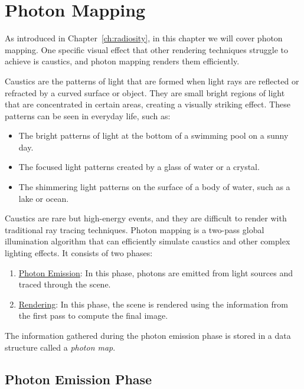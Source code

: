 \chapter{Photon Mapping}\label{ch:photon_mapping}

As introduced in Chapter~\ref{ch:radiosity}, in this chapter we will cover photon mapping. One specific visual effect that other rendering techniques struggle to achieve is caustics, and photon mapping renders them efficiently.
\begin{definicion}[Caustics]
Caustics are the patterns of light that are formed when light rays are reflected or refracted by a curved surface or object. They are small bright regions of light that are concentrated in certain areas, creating a visually striking effect. These patterns can be seen in everyday life, such as:
\begin{itemize}
    \item The bright patterns of light at the bottom of a swimming pool on a sunny day.
    \item The focused light patterns created by a glass of water or a crystal.
    \item The shimmering light patterns on the surface of a body of water, such as a lake or ocean.
\end{itemize}
\end{definicion}

Caustics are rare but high-energy events, and they are difficult to render with traditional ray tracing techniques. Photon mapping is a two-pass global illumination algorithm that can efficiently simulate caustics and other complex lighting effects. It consists of two phases:
\begin{enumerate}
    \item \ul{Photon Emission}: In this phase, photons are emitted from light sources and traced through the scene.
    \item \ul{Rendering}: In this phase, the scene is rendered using the information from the first pass to compute the final image.
\end{enumerate}
The information gathered during the photon emission phase is stored in a data structure called a \emph{photon map}.

\section{Photon Emission Phase}

